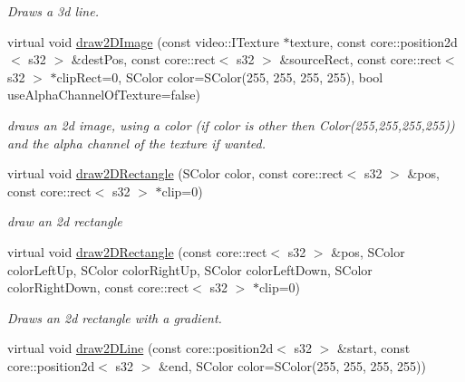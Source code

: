 \begin{DoxyCompactItemize}
\begin{DoxyCompactList}\small\item\em Draws a 3d line. \end{DoxyCompactList}\item 
\hypertarget{classirr_1_1video_1_1_c_software_driver_aa135482d884994bf5ef32e047227f97c}{virtual void \hyperlink{classirr_1_1video_1_1_c_software_driver_aa135482d884994bf5ef32e047227f97c}{draw2\-D\-Image} (const video\-::\-I\-Texture $\ast$texture, const core\-::position2d$<$ s32 $>$ \&dest\-Pos, const core\-::rect$<$ s32 $>$ \&source\-Rect, const core\-::rect$<$ s32 $>$ $\ast$clip\-Rect=0, S\-Color color=S\-Color(255, 255, 255, 255), bool use\-Alpha\-Channel\-Of\-Texture=false)}\label{classirr_1_1video_1_1_c_software_driver_aa135482d884994bf5ef32e047227f97c}

\begin{DoxyCompactList}\small\item\em draws an 2d image, using a color (if color is other then Color(255,255,255,255)) and the alpha channel of the texture if wanted. \end{DoxyCompactList}\item 
\hypertarget{classirr_1_1video_1_1_c_software_driver_a6eb0be7ddfe46de0c9fb53cc461d69c9}{virtual void \hyperlink{classirr_1_1video_1_1_c_software_driver_a6eb0be7ddfe46de0c9fb53cc461d69c9}{draw2\-D\-Rectangle} (S\-Color color, const core\-::rect$<$ s32 $>$ \&pos, const core\-::rect$<$ s32 $>$ $\ast$clip=0)}\label{classirr_1_1video_1_1_c_software_driver_a6eb0be7ddfe46de0c9fb53cc461d69c9}

\begin{DoxyCompactList}\small\item\em draw an 2d rectangle \end{DoxyCompactList}\item 
\hypertarget{classirr_1_1video_1_1_c_software_driver_ac2f3595af172c29d68196201291532a9}{virtual void \hyperlink{classirr_1_1video_1_1_c_software_driver_ac2f3595af172c29d68196201291532a9}{draw2\-D\-Rectangle} (const core\-::rect$<$ s32 $>$ \&pos, S\-Color color\-Left\-Up, S\-Color color\-Right\-Up, S\-Color color\-Left\-Down, S\-Color color\-Right\-Down, const core\-::rect$<$ s32 $>$ $\ast$clip=0)}\label{classirr_1_1video_1_1_c_software_driver_ac2f3595af172c29d68196201291532a9}

\begin{DoxyCompactList}\small\item\em Draws an 2d rectangle with a gradient. \end{DoxyCompactList}\item 
\hypertarget{classirr_1_1video_1_1_c_software_driver_a29ce4d773667259bcbc7c5a6f43285cf}{virtual void \hyperlink{classirr_1_1video_1_1_c_software_driver_a29ce4d773667259bcbc7c5a6f43285cf}{draw2\-D\-Line} (const core\-::position2d$<$ s32 $>$ \&start, const core\-::position2d$<$ s32 $>$ \&end, S\-Color color=S\-Color(255, 255, 255, 255))}\label{classirr_1_1video_1_1_c_software_driver_a29ce4d773667259bcbc7c5a6f43285cf}


\end{DoxyCompactItemize}
